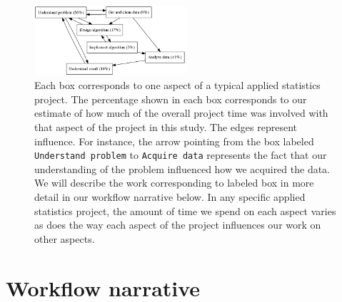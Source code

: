 \documentclass[]{article}
\begin{document}
\begin{figure}[h]
  \centering
    \includegraphics[width=0.5\textwidth]{work_process.png}
  \caption{Each box corresponds to one aspect of a typical applied
           statistics project.
           The percentage shown in each box corresponds to
           our estimate of how much of the overall project time was involved
           with that aspect of the project in this study.
           The edges represent influence.
           For instance,
           the arrow pointing from the box labeled \texttt{Understand problem}
           to \texttt{Acquire data} represents the fact that our understanding
           of the problem influenced how we acquired the data.
           We will describe
           the work corresponding to labeled box in more detail in our
           workflow narrative below.
           In any specific applied statistics project,
           the amount of time we spend on each aspect varies as does the
           way each aspect of the project influences our work on other
           aspects.}
\end{figure}

\section{Workflow narrative}\label{workflow-narrative}
\end{document}
